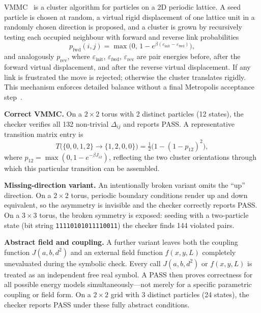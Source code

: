 \documentclass[twocolumn,10pt]{article}
\begin{document}
VMMC~\cite{Whitelam2007} is a cluster algorithm for particles on a 2D periodic
lattice.  A seed particle is chosen at random, a virtual rigid displacement of
one lattice unit in a randomly chosen direction is proposed, and a cluster is
grown by recursively testing each occupied neighbour with forward and reverse
link probabilities
\begin{equation}
  p_\mathrm{fwd}(i,j) = \max\!\bigl(0,\,1-e^{\beta(\varepsilon_\mathrm{init}-\varepsilon_\mathrm{fwd})}\bigr),
\label{eq:plink}
\end{equation}
and analogously $p_\mathrm{rev}$, where $\varepsilon_\mathrm{init}$,
$\varepsilon_\mathrm{fwd}$, $\varepsilon_\mathrm{rev}$ are pair energies
before, after the forward virtual displacement, and after the reverse virtual
displacement.  If any link is frustrated the move is rejected; otherwise the
cluster translates rigidly.  This mechanism enforces detailed balance without
a final Metropolis acceptance step~\cite{Whitelam2007}.

\smallskip\noindent\textbf{Correct VMMC.}
On a $2\times2$ torus with 2 distinct particles (12 states), the checker
verifies all 132 non-trivial $\Delta_{ij}$ and reports PASS.  A representative
transition matrix entry is
\begin{equation}
  T\!\bigl(\{0,0,1,2\}\to\{1,2,0,0\}\bigr) = \tfrac12\bigl(1-(1-p_{12})^2\bigr),
\end{equation}
where $p_{12}=\max(0,1-e^{-\beta J_{12}})$, reflecting the two cluster
orientations through which this particular transition can be assembled.

\smallskip\noindent\textbf{Missing-direction variant.}
An intentionally broken variant omits the ``up'' direction.  On a $2\times2$
torus, periodic boundary conditions render up and down equivalent, so the
asymmetry is invisible and the checker correctly reports PASS.  On a $3\times3$
torus, the broken symmetry is exposed: seeding with a two-particle state
(bit string \texttt{11110101011110011}) the checker finds 144 violated pairs.

\smallskip\noindent\textbf{Abstract field and coupling.}
A further variant leaves both the coupling function $J(a,b,d^2)$ and an
external field function $f(x,y,L)$ completely unevaluated during the symbolic
check.  Every call $J(a,b,d^2)$ or $f(x,y,L)$ is treated as an independent
free real symbol.  A PASS then proves correctness for all possible energy
models simultaneously---not merely for a specific parametric coupling or field
form.  On a $2\times2$ grid with 3 distinct particles (24 states), the checker
reports PASS under these fully abstract conditions.
\end{document}
